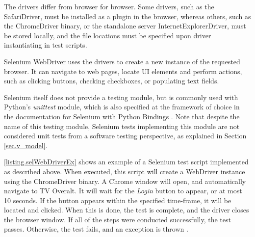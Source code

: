 The drivers differ from browser for browser. Some drivers, such as the SafariDriver, must be installed as a plugin in the browser, whereas others, such as the ChromeDriver binary, or the standalone server InternetExplorerDriver, must be stored locally, and the file locations must be specified upon driver instantiating in test scripts.

Selenium WebDriver uses the drivers to create a new instance of the requested browser. It can navigate to web pages, locate UI elements and perform actions, such as clicking buttons, checking checkboxes, or populating text fields.

Selenium itself does not provide a testing module, but is commonly used with Python's \emph{unittest} module, which is also specified at the framework of choice in the documentation for Selenium with Python Bindings \cite{http://selenium-python.readthedocs.io/index.html}. Note that despite the name of this testing module, Selenium tests implementing this module are not considered unit tests from a software testing perspective, as explained in Section \ref{sec.v_model}.

\lstlistingname \space \ref{listing.selWebDriverEx} shows an example of a Selenium test script implemented as described above. When executed, this script will create a WebDriver instance using the ChromeDriver binary. A Chrome window will open, and automatically navigate to TV Overalt. It will wait for the \emph{Login} button to appear, or at most 10 seconds. If the button appears within the specified time-frame, it will be located and clicked. When this is done, the test is complete, and the driver closes the browser window. If all of the steps were conducted successfully, the test passes. Otherwise, the test fails, and an exception is thrown \cite{https://docs.python.org/2.7/library/unittest.html}.

